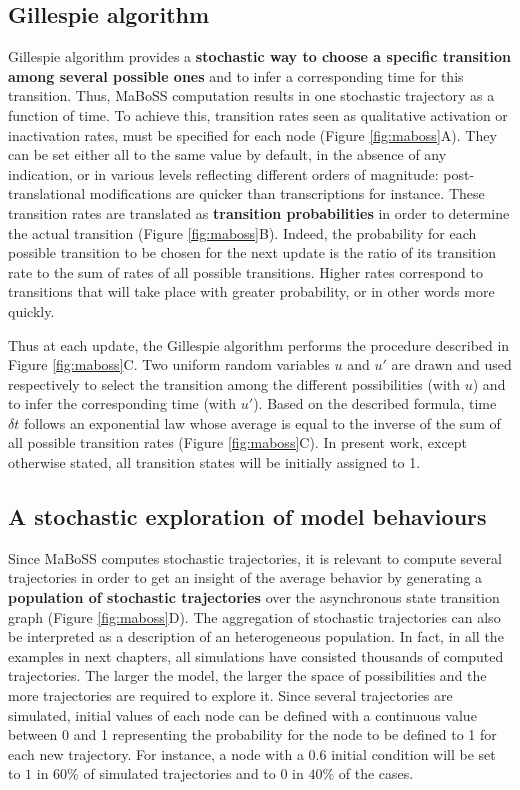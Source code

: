 \documentclass[a4paper,12pt,twoside,onecolumn,openright,final,oldfontcommands]{memoir}
\begin{document}
\subsection{Gillespie algorithm}\label{gillespie-algorithm}

Gillespie algorithm provides a \textbf{stochastic way to choose a
specific transition among several possible ones} and to infer a
corresponding time for this transition. Thus, MaBoSS computation results
in one stochastic trajectory as a function of time. To achieve this,
transition rates seen as qualitative activation or inactivation rates,
must be specified for each node (Figure \ref{fig:maboss}A). They can be
set either all to the same value by default, in the absence of any
indication, or in various levels reflecting different orders of
magnitude: post-translational modifications are quicker than
transcriptions for instance. These transition rates are translated as
\textbf{transition probabilities} in order to determine the actual
transition (Figure \ref{fig:maboss}B). Indeed, the probability for each
possible transition to be chosen for the next update is the ratio of its
transition rate to the sum of rates of all possible transitions. Higher
rates correspond to transitions that will take place with greater
probability, or in other words more quickly.

Thus at each update, the Gillespie algorithm performs the procedure
described in Figure \ref{fig:maboss}C. Two uniform random variables
\(u\) and \(u'\) are drawn and used respectively to select the
transition among the different possibilities (with \(u\)) and to infer
the corresponding time (with \(u'\)). Based on the described formula,
time \(\delta t\) follows an exponential law whose average is equal to
the inverse of the sum of all possible transition rates (Figure
\ref{fig:maboss}C). In present work, except otherwise stated, all
transition states will be initially assigned to 1.

\subsection{A stochastic exploration of model
behaviours}\label{a-stochastic-exploration-of-model-behaviours}

Since MaBoSS computes stochastic trajectories, it is relevant to compute
several trajectories in order to get an insight of the average behavior
by generating a \textbf{population of stochastic trajectories} over the
asynchronous state transition graph (Figure \ref{fig:maboss}D). The
aggregation of stochastic trajectories can also be interpreted as a
description of an heterogeneous population. In fact, in all the examples
in next chapters, all simulations have consisted thousands of computed
trajectories. The larger the model, the larger the space of
possibilities and the more trajectories are required to explore it.
Since several trajectories are simulated, initial values of each node
can be defined with a continuous value between 0 and 1 representing the
probability for the node to be defined to 1 for each new trajectory. For
instance, a node with a \(0.6\) initial condition will be set to \(1\)
in \(60\%\) of simulated trajectories and to \(0\) in \(40\%\) of the
cases.
\end{document}
